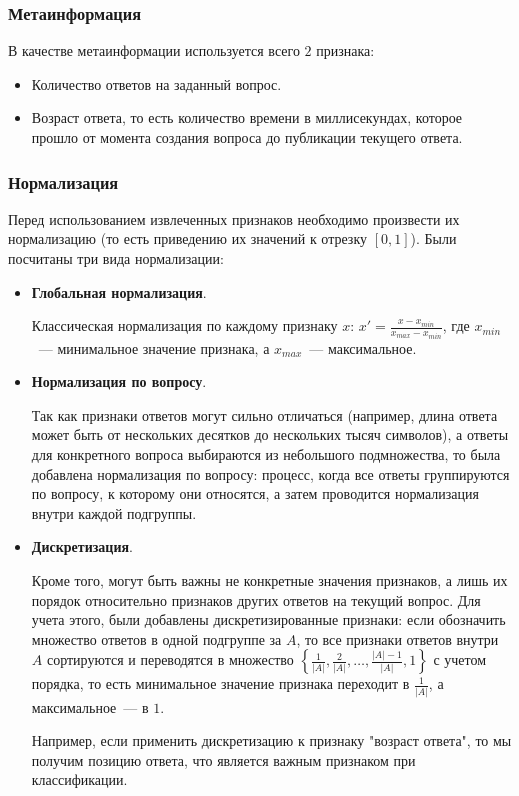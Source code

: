 \documentclass[../diploma.tex]{subfiles}
\begin{document}
	\subsubsection{Метаинформация}

   	В качестве метаинформации используется всего $2$ признака:

   	\begin{itemize}

   		\item
   		Количество ответов на заданный вопрос.

   		\item
   		Возраст ответа, то есть количество времени в миллисекундах, которое прошло от момента создания вопроса до публикации текущего ответа.

   	\end{itemize}
 
	\subsubsection{Нормализация}
    Перед использованием извлеченных признаков необходимо произвести их нормализацию (то есть приведению их значений к отрезку $[0, 1]$).
	Были посчитаны три вида нормализации:

	\begin{itemize}
		\item
		\textbf{Глобальная нормализация}.

        Классическая нормализация по каждому признаку $x$: $x' = \frac{x - x_{min}}{x_{max} - x_{min}}$, 
	   	где $x_{min}$~--- минимальное значение признака, а $x_{max}$~--- максимальное.

	   	\item
	   	\textbf{Нормализация по вопросу}.

	   	Так как признаки ответов могут сильно отличаться (например, длина ответа может быть от нескольких десятков до нескольких тысяч символов), 
	   	а ответы для конкретного вопроса выбираются из небольшого подмножества, то была добавлена нормализация по вопросу: 
	   	процесс, когда все ответы группируются по вопросу, к которому они относятся, а затем проводится нормализация внутри каждой подгруппы.

	    \item
	    \textbf{Дискретизация}.

		Кроме того, могут быть важны не конкретные значения признаков, а лишь их порядок относительно признаков других ответов на текущий вопрос.
		Для учета этого, были добавлены дискретизированные признаки: 
		если обозначить множество ответов в одной подгруппе за $A$, 
		то все признаки ответов внутри $A$ сортируются и переводятся в множество $\left\{ \frac{1}{|A|}, \frac{2}{|A|}, \dots, \frac{|A| - 1}{|A|}, 1\right\}$ 
		с учетом порядка, то есть минимальное значение признака переходит в $\frac{1}{|A|}$, а максимальное~--- в $1$.

		Например, если применить дискретизацию к признаку "возраст ответа", то мы получим позицию ответа, что является важным признаком при классификации. 

	\end{itemize}
\end{document}
